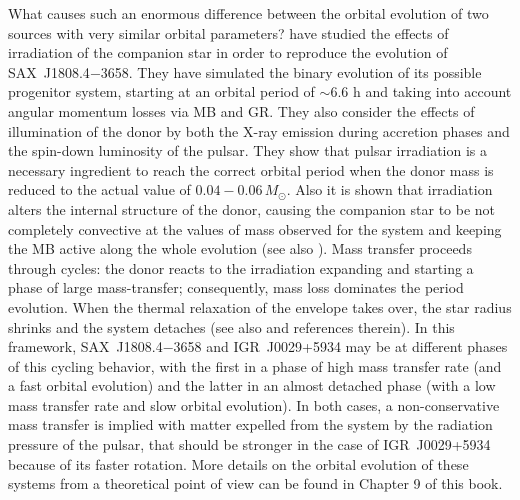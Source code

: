 \documentclass[graybox]{svmult}
\def \saxj{{\rm SAX~J1808.4$-$3658\xspace}}
\begin{document}
What causes such an enormous difference between the orbital evolution of two sources with very similar orbital parameters?  
\cite{Tailo2018} have studied the effects of irradiation of the companion star in order to reproduce the evolution of \saxj{}. They have simulated the binary evolution of its possible progenitor system, starting at an orbital period of $\sim 6.6$ h and taking into account angular momentum losses via MB and GR. They also consider the effects of illumination of the donor by both the X-ray emission during accretion phases and the spin-down luminosity of the pulsar. They show that pulsar irradiation is a necessary ingredient to reach the correct orbital period when the donor mass is reduced to the actual value of $0.04-0.06\, M_\odot$. Also it is shown that irradiation alters the internal structure of the donor, causing the companion star to be not completely convective at the values of mass observed for the system and keeping the MB active along the whole evolution (see also \cite{Chen2017}). Mass transfer proceeds through cycles: the donor reacts to the irradiation expanding and starting a phase of large mass-transfer; consequently, mass loss dominates the period evolution. When the thermal relaxation of the envelope takes over, the star radius shrinks and the system detaches (see also \cite{Benvenuto2017} and references therein). In this framework, \saxj{} and IGR~J0029+5934 may be at different phases of this cycling behavior, with the first in a phase of high mass transfer rate (and a fast orbital evolution) and the latter in an almost detached phase (with a low mass transfer rate and slow orbital evolution). In both cases, a non-conservative mass transfer is implied with matter expelled from the system by the radiation pressure of the pulsar, that should be stronger in the case of IGR~J0029+5934 because of its faster rotation. More details on the orbital evolution of these systems from a theoretical point of view can be found in Chapter 9 of this book. 
\end{document}
